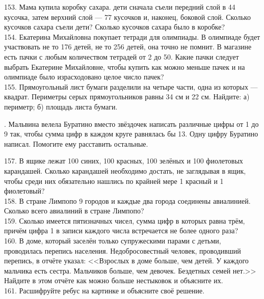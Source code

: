153. Мама купила коробку сахара. дети сначала съели передний слой в 44 кусочка, затем верхний слой --- 77 кусочков и, наконец, боковой слой. Сколько кусочков сахара съели дети? Сколько кусочков сахара было в коробке?\\
154. Екатерина Михайловна покупает тетради для олимпиады. В олимпиаде будет участвовать не то 176 детей, не то 256 детей, она точно не помнит. В магазине есть пачки с любым количеством тетрадей от 2 до 50. Какие пачки следует выбрать Екатерине Михайловне, чтобы купить как можно меньше пачек и на олимпиаде было израсходовано целое число пачек?\\
155. Прямоугольный лист бумаги разделили на четыре части, одна из которых --- квадрат. Периметры серых прямоугольников равны 34 см и 22 см. Найдите: а) периметр; б) площадь листа бумаги.
\begin{center}
\begin{figure}[ht!]
\end{figure}
\end{center}\newpage{}. Мальвина велела Буратино вместо звёздочек написать различные цифры от 1 до 9 так, чтобы сумма цифр в каждом круге равнялась бы 13. Одну цифру Буратино написал. Помогите ему расставить остальные.
\begin{center}
\begin{figure}[ht!]
\end{figure}
\end{center}
157. В ящике лежат 100 синих, 100 красных, 100 зелёных и 100 фиолетовых карандашей. Сколько карандашей необходимо достать, не заглядывая в ящик, чтобы среди них обязательно нашлись по крайней мере 1 красный и 1 фиолетовый?\\
158. В стране Лимпопо 9 городов и каждые два города соединены авиалинией. Сколько всего авиалиний в стране Лимпопо?\\
159. Сколько имеется пятизначных чисел, сумма цифр в которых равна трём, причём цифра 1 в записи каждого числа встречается не более одного раза?\\
160. В доме, который заселён только супружескими парами с детьми, проводилась перепись населения. Недобросовестный человек, проводивший перепись, в отчёте указал: <<Взрослых в доме больше, чем детей. У каждого мальчика есть сестра. Мальчиков больше, чем девочек. Бездетных семей нет.>> Найдите в этом отчёте
как можно больше нестыковок и объясните их.\\
161. Расшифруйте ребус на картинке и объясните своё решение.
